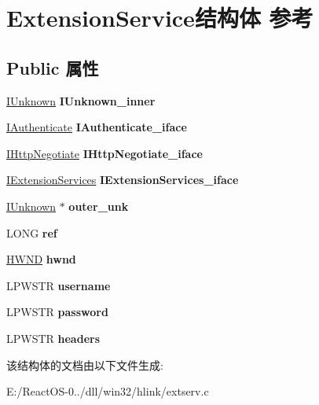 \hypertarget{struct_extension_service}{}\section{Extension\+Service结构体 参考}
\label{struct_extension_service}
\subsection*{Public 属性}
\begin{DoxyCompactItemize}
\item 
\mbox{\label{struct_extension_service_a5973e4db4875a101a83ecef172ba5f5a}} 
\hyperlink{interface_i_unknown}{I\+Unknown} {\bfseries I\+Unknown\+\_\+inner}
\item 
\mbox{\label{struct_extension_service_a5f1ddb356bd3217a8c32387762e5156d}} 
\hyperlink{interface_i_authenticate}{I\+Authenticate} {\bfseries I\+Authenticate\+\_\+iface}
\item 
\mbox{\label{struct_extension_service_a8102426c688382366740431d8ff66d20}} 
\hyperlink{interface_i_http_negotiate}{I\+Http\+Negotiate} {\bfseries I\+Http\+Negotiate\+\_\+iface}
\item 
\mbox{\label{struct_extension_service_a759c2e58478b028c7786d7988eb423f7}} 
\hyperlink{interface_i_extension_services}{I\+Extension\+Services} {\bfseries I\+Extension\+Services\+\_\+iface}
\item 
\mbox{\label{struct_extension_service_a3b27ce431c3b217fc9f53c67a15cc1be}} 
\hyperlink{interface_i_unknown}{I\+Unknown} $\ast$ {\bfseries outer\+\_\+unk}
\item 
\mbox{\label{struct_extension_service_acdd0c3857d1192ebf8dfc0c192a764f7}} 
L\+O\+NG {\bfseries ref}
\item 
\mbox{\label{struct_extension_service_ae74c60ee09ab602134ceea1b824b9069}} 
\hyperlink{interfacevoid}{H\+W\+ND} {\bfseries hwnd}
\item 
\mbox{\label{struct_extension_service_ad13964acbd56a7b627df3c8b6dcc0f70}} 
L\+P\+W\+S\+TR {\bfseries username}
\item 
\mbox{\label{struct_extension_service_a62f24d0ba4d0fc08dcc3930411b9ef2c}} 
L\+P\+W\+S\+TR {\bfseries password}
\item 
\mbox{\label{struct_extension_service_a3291b40310c8d31e4d1beaad5f733a81}} 
L\+P\+W\+S\+TR {\bfseries headers}
\end{DoxyCompactItemize}


该结构体的文档由以下文件生成\+:\begin{DoxyCompactItemize}
\item 
E\+:/\+React\+O\+S-\/0../dll/win32/hlink/extserv.\+c\end{DoxyCompactItemize}
